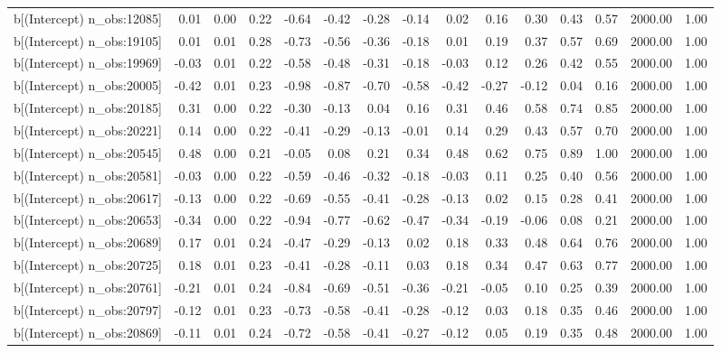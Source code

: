 \begin{table}[ht]
\begin{tabular}{rrrrrrrrrrrrrrr}
  b[(Intercept) n\_obs:12085] & 0.01 & 0.00 & 0.22 & -0.64 & -0.42 & -0.28 & -0.14 & 0.02 & 0.16 & 0.30 & 0.43 & 0.57 & 2000.00 & 1.00 \\ 
  b[(Intercept) n\_obs:19105] & 0.01 & 0.01 & 0.28 & -0.73 & -0.56 & -0.36 & -0.18 & 0.01 & 0.19 & 0.37 & 0.57 & 0.69 & 2000.00 & 1.00 \\ 
  b[(Intercept) n\_obs:19969] & -0.03 & 0.01 & 0.22 & -0.58 & -0.48 & -0.31 & -0.18 & -0.03 & 0.12 & 0.26 & 0.42 & 0.55 & 2000.00 & 1.00 \\ 
  b[(Intercept) n\_obs:20005] & -0.42 & 0.01 & 0.23 & -0.98 & -0.87 & -0.70 & -0.58 & -0.42 & -0.27 & -0.12 & 0.04 & 0.16 & 2000.00 & 1.00 \\ 
  b[(Intercept) n\_obs:20185] & 0.31 & 0.00 & 0.22 & -0.30 & -0.13 & 0.04 & 0.16 & 0.31 & 0.46 & 0.58 & 0.74 & 0.85 & 2000.00 & 1.00 \\ 
  b[(Intercept) n\_obs:20221] & 0.14 & 0.00 & 0.22 & -0.41 & -0.29 & -0.13 & -0.01 & 0.14 & 0.29 & 0.43 & 0.57 & 0.70 & 2000.00 & 1.00 \\ 
  b[(Intercept) n\_obs:20545] & 0.48 & 0.00 & 0.21 & -0.05 & 0.08 & 0.21 & 0.34 & 0.48 & 0.62 & 0.75 & 0.89 & 1.00 & 2000.00 & 1.00 \\ 
  b[(Intercept) n\_obs:20581] & -0.03 & 0.00 & 0.22 & -0.59 & -0.46 & -0.32 & -0.18 & -0.03 & 0.11 & 0.25 & 0.40 & 0.56 & 2000.00 & 1.00 \\ 
  b[(Intercept) n\_obs:20617] & -0.13 & 0.00 & 0.22 & -0.69 & -0.55 & -0.41 & -0.28 & -0.13 & 0.02 & 0.15 & 0.28 & 0.41 & 2000.00 & 1.00 \\ 
  b[(Intercept) n\_obs:20653] & -0.34 & 0.00 & 0.22 & -0.94 & -0.77 & -0.62 & -0.47 & -0.34 & -0.19 & -0.06 & 0.08 & 0.21 & 2000.00 & 1.00 \\ 
  b[(Intercept) n\_obs:20689] & 0.17 & 0.01 & 0.24 & -0.47 & -0.29 & -0.13 & 0.02 & 0.18 & 0.33 & 0.48 & 0.64 & 0.76 & 2000.00 & 1.00 \\ 
  b[(Intercept) n\_obs:20725] & 0.18 & 0.01 & 0.23 & -0.41 & -0.28 & -0.11 & 0.03 & 0.18 & 0.34 & 0.47 & 0.63 & 0.77 & 2000.00 & 1.00 \\ 
  b[(Intercept) n\_obs:20761] & -0.21 & 0.01 & 0.24 & -0.84 & -0.69 & -0.51 & -0.36 & -0.21 & -0.05 & 0.10 & 0.25 & 0.39 & 2000.00 & 1.00 \\ 
  b[(Intercept) n\_obs:20797] & -0.12 & 0.01 & 0.23 & -0.73 & -0.58 & -0.41 & -0.28 & -0.12 & 0.03 & 0.18 & 0.35 & 0.46 & 2000.00 & 1.00 \\ 
  b[(Intercept) n\_obs:20869] & -0.11 & 0.01 & 0.24 & -0.72 & -0.58 & -0.41 & -0.27 & -0.12 & 0.05 & 0.19 & 0.35 & 0.48 & 2000.00 & 1.00 \\ 

\end{tabular}
\end{table}
